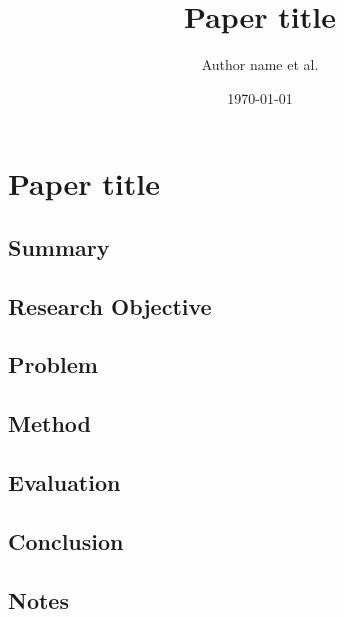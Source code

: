 \documentclass[UTF8, a4paper]{ctexart}
\begin{document}
\title{Paper title}
\author{Author name et al.}
\date\today
\maketitle
\fi
\section{Paper title}

\subsection{Summary} %

\subsection{Research Objective} %

\subsection{Problem} %

\subsection{Method} %

\subsection{Evaluation} %

\subsection{Conclusion} %

\subsection{Notes} %


\ifx\allfiles\undefined
\end{document}
